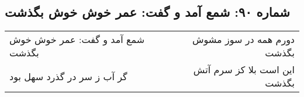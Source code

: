 \begin{center}
\section*{شماره ۹۰: شمع آمد و گفت: عمر خوش خوش بگذشت}
\label{sec:090}
\begin{longtable}{l p{0.5cm} r}
شمع آمد و گفت: عمر خوش خوش بگذشت
&&
دورم همه در سوز مشوش بگذشت
\\
گر آب ز سر در گذرد سهل بود
&&
این است بلا کز سرم آتش بگذشت
\\
\end{longtable}
\end{center}
